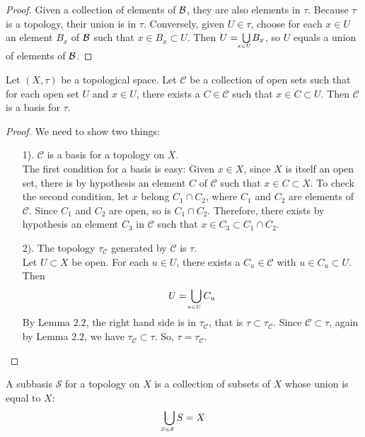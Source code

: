 \begin{proof}
Given a collection of elements of $\mathcal{B}$, they are also elements in $\tau$. Because $\tau$ is a topology, their union is in $\tau$. Conversely, given $U \in \tau$, choose for each $x\in U$ an element $B_x$ of $\mathcal{B}$ such that $x \in B_x \subset U$. Then $U = \underaccent{x \in U}{\bigcup} B_x$, so $U$ equals a union of elements of $\mathcal{B}$. 
\end{proof}

\begin{customlemma}{2.3}
Let $(X, \tau)$ be a topological space. Let $\mathcal{C}$ be a collection of open sets such that for each open set $U$ and $x \in U$, there exists a $C\in \mathcal{C}$ such that $x \in C \subset U$. Then $\mathcal{C}$ is a basis for $\tau$.
\end{customlemma}

\begin{proof}
We need to show two things:
\begin{enumerate}
    \item[1).] $\mathcal{C}$ is a basis for a topology on $X$.\\
            The first condition for a basis is easy: Given $x\in X$, since $X$ is itself an open set, there is by hypothesis an element $C$ of $\mathcal{C}$ such that $x\in C \subset X$. To check the second condition, let $x$ belong $C_1 \cap C_2$, where $C_1$ and $C_2$ are elements of $\mathcal{C}$. Since $C_1$ and $C_2$ are open, so is $C_1 \cap C_2$. Therefore, there exists by hypothesis an element $C_3$ in $\mathcal{C}$ such that $x \in C_3 \subset C_1 \cap C_2$.
    \item[2).] The topology $\tau_{\mathcal{C}}$ generated by $\mathcal{C}$ is $\tau$.\\
            Let $U \subset X$ be open. For each $u \in U$, there exists a $C_u \in \mathcal{C}$ with $u \in C_u \subset U$. Then 
                    $$U = \underaccent{u \in U}{\bigcup} C_u$$
            By Lemma $2.2$, the right hand side is in $\tau_{\mathcal{C}}$, that is $\tau \subset \tau_{\mathcal{C}}$. Since $\mathcal{C} \subset \tau$, again by Lemma $2.2$, we have $\tau_{\mathcal{C}} \subset \tau$. So, $\tau = \tau_{\mathcal{C}}$.
\end{enumerate}
\end{proof}

\newpage

\begin{customdefinition}{2.7}
A subbasis $\mathcal{S}$ for a topology on $X$ is a collection of subsets of $X$ whose union is equal to $X$:
    $$\underaccent{S \in \mathcal{S}}{\bigcup}S = X$$
\end{customdefinition}


